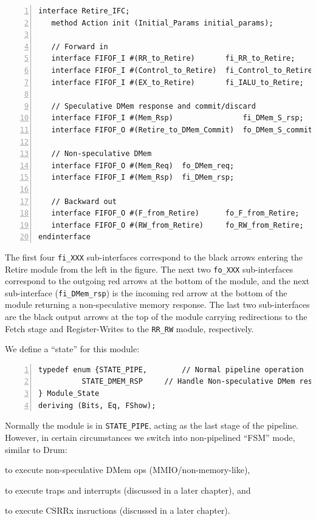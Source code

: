{\small
\begin{Verbatim}[frame=single, numbers=left, label=(In file:src\_Fife/S5\_Retire.bsv)]
interface Retire_IFC;
   method Action init (Initial_Params initial_params);

   // Forward in
   interface FIFOF_I #(RR_to_Retire)       fi_RR_to_Retire;
   interface FIFOF_I #(Control_to_Retire)  fi_Control_to_Retire;
   interface FIFOF_I #(EX_to_Retire)       fi_IALU_to_Retire;

   // Speculative DMem response and commit/discard
   interface FIFOF_I #(Mem_Rsp)                fi_DMem_S_rsp;
   interface FIFOF_O #(Retire_to_DMem_Commit)  fo_DMem_S_commit;

   // Non-speculative DMem
   interface FIFOF_O #(Mem_Req)  fo_DMem_req;
   interface FIFOF_I #(Mem_Rsp)  fi_DMem_rsp;

   // Backward out
   interface FIFOF_O #(F_from_Retire)      fo_F_from_Retire;
   interface FIFOF_O #(RW_from_Retire)     fo_RW_from_Retire;
endinterface
\end{Verbatim}
}

The first four \verb|fi_XXX| sub-interfaces correspond to the black
arrows entering the Retire module from the left in the figure.  The
next two \verb|fo_XXX| sub-interfaces correspond to the outgoing red
arrows at the bottom of the module, and the next sub-interface
(\verb|fi_DMem_rsp|) is the incoming red arrow at the bottom of the
module returning a non-speculative memory response.  The last two
sub-interfaces are the black output arrows at the top of the module
carrying redirections to the Fetch stage and Register-Writes to the
\verb|RR_RW| module, respectively.

We define a ``state'' for this module:

{\small
\begin{Verbatim}[frame=single, numbers=left, label=(In file:src\_Fife/S5\_Retire.bsv)]
typedef enum {STATE_PIPE,        // Normal pipeline operation
	      STATE_DMEM_RSP     // Handle Non-speculative DMem response
} Module_State
deriving (Bits, Eq, FShow);
\end{Verbatim}
}

Normally the module is in \verb|STATE_PIPE|, acting as the last stage
of the pipeline.  However, in certain circumstances we switch into
non-pipelined ``FSM'' mode, similar to Drum:

\begin{tightlist}

\item to execute non-speculative DMem ops (MMIO/non-memory-like),

\item to execute traps and interrupts (discussed in a later chapter), and

\item to execute CSRRx insructions  (discussed in a later chapter).

\end{tightlist}

